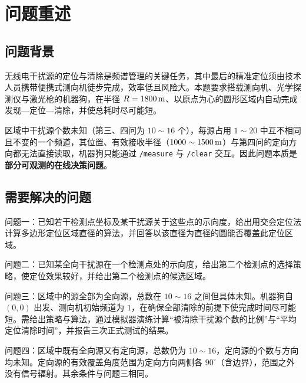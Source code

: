 \section{问题重述}

\subsection{问题背景}

无线电干扰源的定位与清除是频谱管理的关键任务，其中最后的精准定位须由技术人员携带便携式测向机徒步完成，效率低且风险大。本题要求搭载测向机、光学探测仪与激光枪的机器狗，在半径 $R=1800\,\mathrm{m}$、以原点为心的圆形区域内自动完成发现—定位—清除，并使总耗时尽可能短。

区域中干扰源个数未知（第三、四问为 $10\sim16$ 个），每源占用 $1\sim20$ 中互不相同且不变的一个频道，其位置、有效接收半径（$1000\sim1500\,\mathrm{m}$）与第四问的定向方向都无法直接读取，机器狗只能通过 \texttt{/measure} 与 \texttt{/clear} 交互。因此问题本质是\textbf{部分可观测的在线决策问题}。

\subsection{需要解决的问题}

问题一：已知若干检测点坐标及某干扰源关于这些点的示向度，给出用交会定位法计算多边形定位区域直径的算法，并回答以该直径为直径的圆能否覆盖此定位区域。

问题二：已知某全向干扰源在一个检测点处的示向度，给出第二个检测点的选择策略，使定位效果较好，并给出第二个检测点的候选区域。

问题三：区域中的源全部为全向源，总数在 $10\sim16$ 之间但具体未知。机器狗自 $(0,0)$ 出发、测向机初始频道为 $1$，在确保全部清除的前提下使完成时间尽可能短。需给出策略与算法，通过模拟器演练计算“被清除干扰源个数的比例”与“平均定位清除时间”，并报告三次正式测试的结果。

问题四：区域中既有全向源又有定向源，总数仍为 $10\sim16$，定向源的个数与方向均未知。定向源的有效覆盖角度范围为定向方向两侧各 $90^\circ$（含边界），范围之外没有信号辐射。其余条件与问题三相同。
